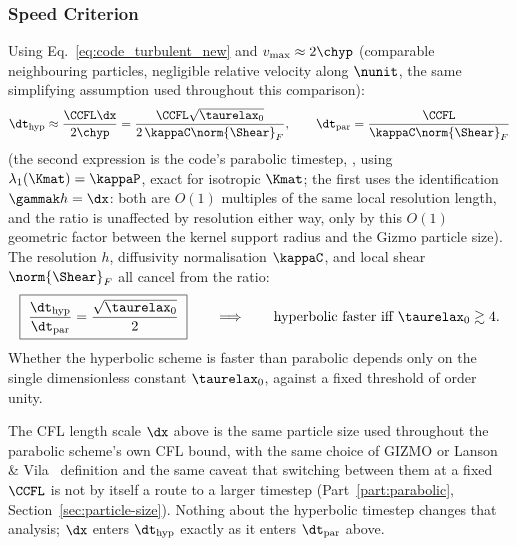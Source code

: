 \subsubsection{Speed Criterion}
\label{sec:speed-criterion}
Using Eq.~\eqref{eq:code_turbulent_new} and $v_{\max}\approx2\chyp$
(comparable neighbouring particles, negligible relative velocity along
$\nunit$, the same simplifying assumption used throughout this
comparison):
\begin{equation}
  \dt_{\rm hyp} \approx \frac{\CCFL\dx}{2\chyp}
  = \frac{\CCFL\sqrt{\taurelax_0}}{2\,\kappaC\norm{\Shear}_F} ,
  \qquad
  \dt_{\rm par} = \frac{\CCFL}{\kappaC\norm{\Shear}_F}
\end{equation}
(the second expression is the code's 
parabolic timestep, , using
$\lambda_1(\Kmat)=\kappaP$, exact for isotropic $\Kmat$; the first uses the identification
$\gammak h=\dx$: both are $O(1)$ multiples of the same local resolution
length, and the ratio is unaffected by resolution either way, only by
this $O(1)$ geometric factor between the kernel support radius and the
Gizmo particle size). The resolution $h$, diffusivity normalisation
$\kappaC$, and local shear $\norm{\Shear}_F$ all cancel from the ratio:
\begin{equation}
  \label{eq:revised_ratio}
  \boxed{\;\frac{\dt_{\rm hyp}}{\dt_{\rm par}} = \frac{\sqrt{\taurelax_0}}{2} \;}
  \qquad\Longrightarrow\qquad
  \text{hyperbolic faster iff } \taurelax_0 \gtrsim 4 .
\end{equation}
Whether the hyperbolic scheme is faster than parabolic depends only on
the single dimensionless constant $\taurelax_0$, against a fixed
threshold of order unity.

\begin{remark}
\label{rem:particle-size-definitions}
The CFL length scale $\dx$ above is the same particle size used
throughout the parabolic scheme's own CFL bound, with the same choice of
GIZMO or Lanson \& Vila~\citeyear{LansonVila2008} definition and the same
caveat that switching between them at a fixed $\CCFL$ is not by itself a
route to a larger timestep (Part~\ref{part:parabolic},
Section~\ref{sec:particle-size}). Nothing about the hyperbolic timestep
changes that analysis; $\dx$ enters $\dt_{\rm hyp}$ exactly as it enters
$\dt_{\rm par}$ above.
\end{remark}


